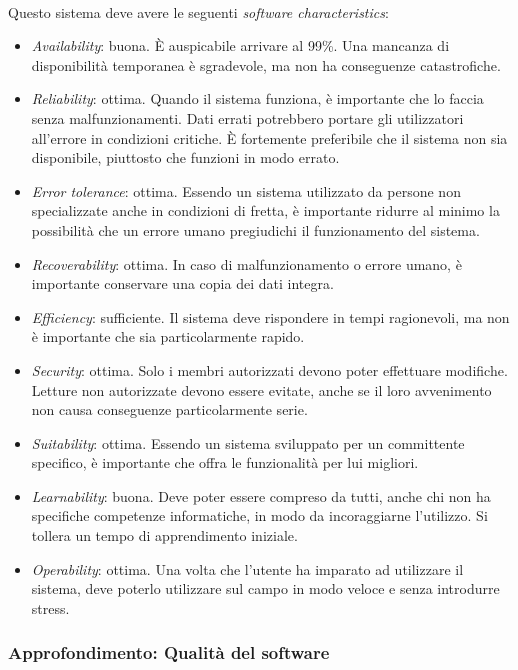 \documentclass[11pt,a4paper,english]{article}
\begin{document}
\paragraph{} Questo sistema deve avere le seguenti \emph{software characteristics}:
\begin{itemize}
    \item \emph{Availability}: buona. È auspicabile arrivare al 99\%. Una mancanza di disponibilità temporanea è sgradevole, ma non ha conseguenze catastrofiche. 
    \item \emph{Reliability}: ottima. Quando il sistema funziona, è importante che lo faccia senza malfunzionamenti. Dati errati potrebbero portare gli utilizzatori all'errore in condizioni critiche. È fortemente preferibile che il sistema non sia disponibile, piuttosto che funzioni in modo errato.
    \item \emph{Error tolerance}: ottima. Essendo un sistema utilizzato da persone non specializzate anche in condizioni di fretta, è importante ridurre al minimo la possibilità che un errore umano pregiudichi il funzionamento del sistema. 
    \item \emph{Recoverability}: ottima. In caso di malfunzionamento o errore umano, è importante conservare una copia dei dati integra. 
    \item \emph{Efficiency}: sufficiente. Il sistema deve rispondere in tempi ragionevoli, ma non è importante che sia particolarmente rapido. 
    \item \emph{Security}: ottima. Solo i membri autorizzati devono poter effettuare modifiche. Letture non autorizzate devono essere evitate, anche se il loro avvenimento non causa conseguenze particolarmente serie. 
    \item \emph{Suitability}: ottima. Essendo un sistema sviluppato per un committente specifico, è importante che offra le funzionalità per lui migliori. 
    \item \emph{Learnability}: buona. Deve poter essere compreso da tutti, anche chi non ha specifiche competenze informatiche, in modo da incoraggiarne l'utilizzo. Si tollera un tempo di apprendimento iniziale.
    \item \emph{Operability}: ottima. Una volta che l'utente ha imparato ad utilizzare il sistema, deve poterlo utilizzare sul campo in modo veloce e senza introdurre stress.
\end{itemize}


\subsubsection{Approfondimento: Qualità del software}
\end{document}
